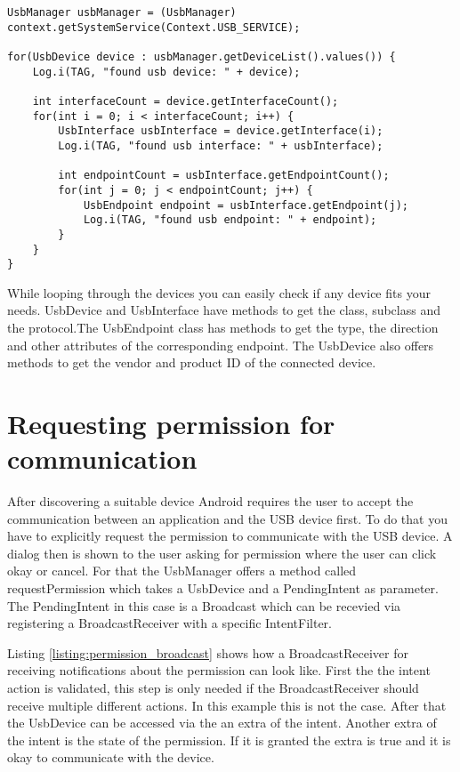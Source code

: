 \begin{lstlisting}[caption=Accessing UsbInterface and UsbEndpoint, label=listing:interface_endpoint]
UsbManager usbManager = (UsbManager) context.getSystemService(Context.USB_SERVICE);
		
for(UsbDevice device : usbManager.getDeviceList().values()) {
	Log.i(TAG, "found usb device: " + device);
	
	int interfaceCount = device.getInterfaceCount();
	for(int i = 0; i < interfaceCount; i++) {
		UsbInterface usbInterface = device.getInterface(i);
		Log.i(TAG, "found usb interface: " + usbInterface);
		
		int endpointCount = usbInterface.getEndpointCount();
		for(int j = 0; j < endpointCount; j++) {
			UsbEndpoint endpoint = usbInterface.getEndpoint(j);
			Log.i(TAG, "found usb endpoint: " + endpoint);
		}
	}
}
\end{lstlisting}

While looping through the devices you can easily check if any device fits your needs. UsbDevice and UsbInterface have methods to get the class, subclass and the protocol.The UsbEndpoint class has methods to get the type, the direction and other attributes of the corresponding endpoint. The UsbDevice also offers methods to get the vendor and product ID of the connected device.

\section{Requesting permission for communication}
\label{section:request_permission}

After discovering a suitable device Android requires the user to accept the communication between an application and the USB device first. To do that you have to explicitly request the permission to communicate with the USB device. A dialog then is shown to the user asking for permission where the user can click okay or cancel. For that the UsbManager offers a method called requestPermission which takes a UsbDevice and a PendingIntent as parameter. The PendingIntent in this case is a Broadcast which can be recevied via registering a BroadcastReceiver with a specific IntentFilter.

Listing \ref{listing:permission_broadcast} shows how a BroadcastReceiver for receiving notifications about the permission can look like. First the the intent action is validated, this step is only needed if the BroadcastReceiver should receive multiple different actions. In this example this is not the case. After that the UsbDevice can be accessed via the an extra of the intent. Another extra of the intent is the state of the permission. If it is granted the extra is true and it is okay to communicate with the device.

